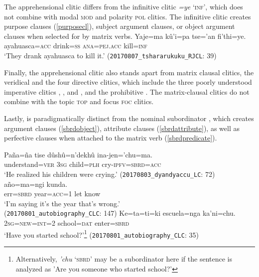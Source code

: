 \documentclass[output=paper,colorlinks,citecolor=brown]{langscibook}
\begin{document}
The apprehensional clitic  differs from the infinitive clitic \emph{=ye} `\textsc{inf}', which does not combine with modal {\textsc{mod}} and polarity {\textsc{pol}} clitics. The infinitive clitic  creates purpose clauses (\ref{purposecl}), subject argument clauses, %
or object argument clauses when selected for by matrix verbs.
    \ea \label{purposecl} %
    \gll Yaje=ma kû'i=pa {\ob}tse='an fi'thi=ye.{\cb} \\
         ayahuasca=\textsc{acc} drink=\textsc{ss} \textsc{ana=\textsc{pej}.acc} kill=\textsc{inf} \\
    \glt `They drank ayahuasca to kill it.'
    \hfill (\texttt{20170807\_tshararukuku\_RJCL}: {\textsc{39}})
    \z 

Finally, the apprehensional clitic  also stands apart from matrix clausal clitics, \ie the veridical  and the four directive clitics, which include the three poorly understood imperative clitics , , and , and the prohibitive . The matrix-clausal clitics do not combine with the topic {\textsc{top}} and focus {\textsc{foc}} clitics.

\iffalse

Lastly,  is paradigmatically distinct from the nominal subordinator , which creates argument clauses (\ref{sbrdobject}), attribute clauses (\ref{sbrdattribute}), as well as perfective clauses when attached to the matrix verb (\ref{sbrdpredicate}).
\begin{exe}
    \ex \label{sbrdobject} %
    \gll Paña=ña           {\ob}tise    dûshû=n'dekhû ina-jen='chu=ma.{\cb}\\
         understand=\textsc{ver} \textsc{3sg} child=\textsc{plh}  cry-\textsc{ipfv=sbrd=acc}   \\
    \glt  `He realized his children were crying.'
    \hfill (\texttt{20170803\_dyandyaccu\_LC}: {\textsc{72}})
    \ex \label{sbrdattribute} %
     {año=ma=ngi}    {kunda}. \\
         {err=\textsc{sbrd}}     {year=\textsc{acc=1}} {let know}  \\
    \glt `I'm saying it's the year that's wrong.' \\
    \hfill (\texttt{20170801\_autobiography\_CLC}: {\textsc{147}})
    \ex \label{sbrdpredicate}
    \gll {\ob}Ke=ta=ti=ki escuela=nga ka'ni=chu.{\cb} \\
         \textsc{2sg=new=int=2} school=\textsc{dat} enter=\textsc{sbrd}   \\
    \glt `Have you started school?'\footnote{Alternatively, \textit{\eq'chu} `{\textsc{sbrd}'} may be a subordinator here if the sentence is analyzed as 'Are you someone who started school?'}
    \hfill (\texttt{20170801\_autobiography\_CLC}: {\textsc{35}})
\end{exe}
\end{document}
